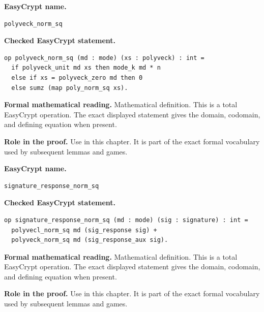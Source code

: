 \begin{formaldefinition}
\noindent\textbf{EasyCrypt name.}
\begin{lstlisting}[language=EasyCrypt,basicstyle=\ttfamily\scriptsize]
polyveck_norm_sq
\end{lstlisting}
\noindent\textbf{Checked EasyCrypt statement.}
\begin{lstlisting}[language=EasyCrypt,basicstyle=\ttfamily\scriptsize]
op polyveck_norm_sq (md : mode) (xs : polyveck) : int =
  if polyveck_unit md xs then mode_k md * n
  else if xs = polyveck_zero md then 0
  else sumz (map poly_norm_sq xs).
\end{lstlisting}
\noindent\textbf{Formal mathematical reading.}
Mathematical definition. This is a total EasyCrypt operation.  The exact displayed statement gives the domain, codomain, and defining equation when present.

\noindent\textbf{Role in the proof.}
Use in this chapter. It is part of the exact formal vocabulary used by subsequent lemmas and games.

\end{formaldefinition}

\begin{formaldefinition}
\noindent\textbf{EasyCrypt name.}
\begin{lstlisting}[language=EasyCrypt,basicstyle=\ttfamily\scriptsize]
signature_response_norm_sq
\end{lstlisting}
\noindent\textbf{Checked EasyCrypt statement.}
\begin{lstlisting}[language=EasyCrypt,basicstyle=\ttfamily\scriptsize]
op signature_response_norm_sq (md : mode) (sig : signature) : int =
  polyvecl_norm_sq md (sig_response sig) +
  polyveck_norm_sq md (sig_response_aux sig).
\end{lstlisting}
\noindent\textbf{Formal mathematical reading.}
Mathematical definition. This is a total EasyCrypt operation.  The exact displayed statement gives the domain, codomain, and defining equation when present.

\noindent\textbf{Role in the proof.}
Use in this chapter. It is part of the exact formal vocabulary used by subsequent lemmas and games.

\end{formaldefinition}

